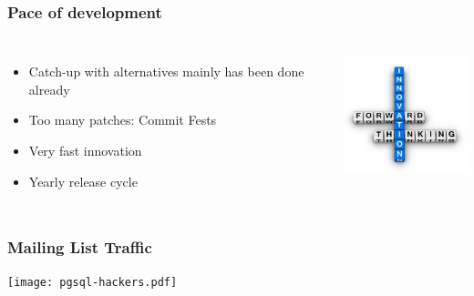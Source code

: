 \documentclass{beamer}
\begin{document}
\begin{frame}[fragile]
  \frametitle{Pace of development}

  \vfill

\begin{columns}[c]

  \begin{itemize}
  \item Catch-up with alternatives mainly has been done already
  \item Too many patches: Commit Fests
  \item Very fast innovation
  \item Yearly release cycle
  \end{itemize}

\begin{center}
  \includegraphics[height=10em]{innovation.jpg}
\end{center}
\end{columns}
\end{frame}

\begin{frame}
  \frametitle{Mailing List Traffic}

  
  \begin{center}
    \texttt{[image: pgsql-hackers.pdf]}
  \end{center}
\end{frame}
\end{document}
